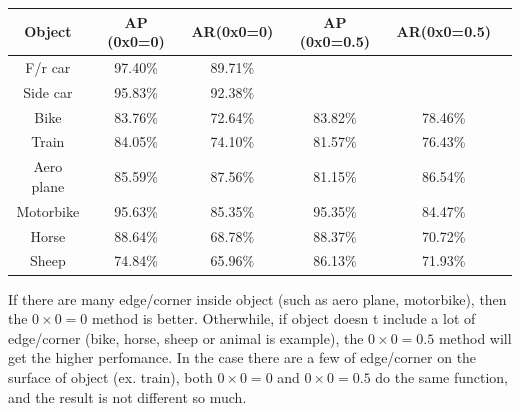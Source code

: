 \begin{table}[htbp]
\small
\begin{tabular}{|c|c|c|c|c|c|}%
    \hline
     Object &  AP (0x0=0) & AR(0x0=0) & AP (0x0=0.5)  & AR(0x0=0.5)  \\ \hline
     F/r car & 97.40\% & 89.71\% & & \\ \hline
     Side car & 95.83\% & 92.38\% & & \\ \hline
	 Bike & 83.76\% & 72.64\% & 83.82\% & 78.46\% \\ \hline
	Train & 84.05\% & 74.10\% & 81.57\% & 76.43\% \\ \hline
	Aero plane & 85.59\% & 87.56\% & 81.15\% & 86.54\% \\ \hline
	Motorbike & 95.63\% & 85.35\% & 95.35\% & 84.47\% \\ \hline
	Horse & 88.64\% & 68.78\% & 88.37\% & 70.72\% \\ \hline
	Sheep & 74.84\% & 65.96\% & 86.13\% & 71.93\% \\ \hline
\end{tabular}
\label{table:compare_0_5}
\end{table}
If there are many edge/corner inside object (such as aero plane,
motorbike), then the $0\times 0=0$ method is better. Otherwhile, if object
doesn t include a lot of edge/corner (bike, horse, sheep or animal is
example), the $0\times 0=0.5$ method will get the higher perfomance. In the
case there are a few of edge/corner on the surface of object (ex.
train), both $0\times 0=0$ and $0\times 0=0.5$ do the same function, and the result
is not different so much.
